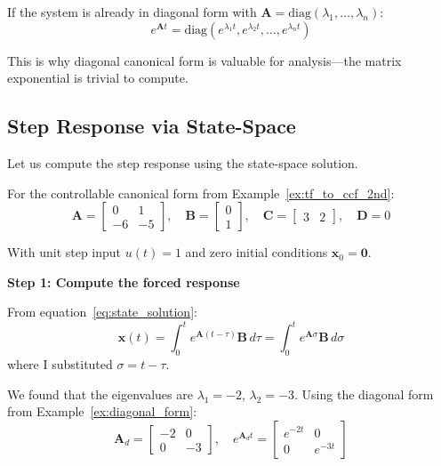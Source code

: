 If the system is already in diagonal form with $\mathbf{A} = \text{diag}(\lambda_1, \ldots, \lambda_n)$:
\begin{equation}
e^{\mathbf{A}t} = \text{diag}(e^{\lambda_1 t}, e^{\lambda_2 t}, \ldots, e^{\lambda_n t})
\end{equation}

This is why diagonal canonical form is valuable for analysis---the matrix exponential is trivial to compute.

\subsection{Step Response via State-Space}

Let us compute the step response using the state-space solution.

\begin{example}
\label{ex:step_response_ss}
For the controllable canonical form from Example~\ref{ex:tf_to_ccf_2nd}:
\begin{equation}
\mathbf{A} = \begin{bmatrix} 0 & 1 \\ -6 & -5 \end{bmatrix}, \quad
\mathbf{B} = \begin{bmatrix} 0 \\ 1 \end{bmatrix}, \quad
\mathbf{C} = \begin{bmatrix} 3 & 2 \end{bmatrix}, \quad
\mathbf{D} = 0
\end{equation}

With unit step input $u(t) = 1$ and zero initial conditions $\mathbf{x}_0 = \mathbf{0}$.

\textbf{Step 1: Compute the forced response}

From equation~\eqref{eq:state_solution}:
\begin{equation}
\mathbf{x}(t) = \int_0^t e^{\mathbf{A}(t-\tau)}\mathbf{B}\,d\tau = \int_0^t e^{\mathbf{A}\sigma}\mathbf{B}\,d\sigma
\end{equation}
where I substituted $\sigma = t - \tau$.

We found that the eigenvalues are $\lambda_1 = -2$, $\lambda_2 = -3$. Using the diagonal form from Example~\ref{ex:diagonal_form}:
\begin{equation}
\mathbf{A}_d = \begin{bmatrix} -2 & 0 \\ 0 & -3 \end{bmatrix}, \quad e^{\mathbf{A}_d t} = \begin{bmatrix} e^{-2t} & 0 \\ 0 & e^{-3t} \end{bmatrix}
\end{equation}


\end{example}

